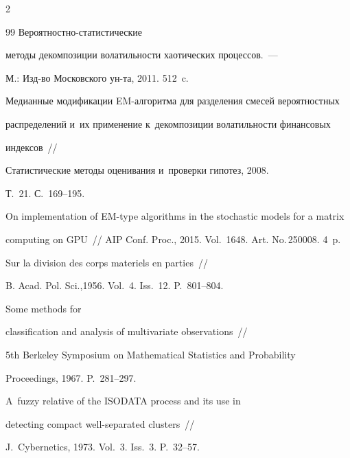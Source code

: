 \begin{multicols}{2}
{{\begin{thebibliography}{99}
 Ве\-ро\-ят\-ност\-но-ста\-ти\-сти\-че\-ские 

методы декомпозиции волатильности хаотических процессов.~--- 

М.: Изд-во Московского ун-та, 2011. 512~c.





Медианные модификации EM-алгоритма для разделения смесей вероятностных 

распределений и~их применение к~декомпозиции волатильности финансовых 

индексов~//

Статистические методы оценивания и~про\-вер\-ки гипотез, 2008. 

Т.~21. С.~169--195.





On implementation of EM-type algorithms in the stochastic models for a matrix 

computing on GPU~// AIP Conf. Proc., 2015. Vol.~1648. Art. No.\,250008. 4~p.




 Sur la division des corps materiels en parties~// 

B. Acad. Pol. Sci.,1956. Vol.~4. Iss.~12. P.~801--804.




 Some methods for 

classification and analysis of multivariate observations~// 

5th Berkeley Symposium on Mathematical Statistics and Probability

Proceedings, 1967. P.~281--297.




 A~fuzzy relative of the ISODATA process and its use in 

detecting compact well-separated clusters~// 

J.~Cybernetics, 1973. Vol.~3. Iss.~3. P.~32--57.





\end{thebibliography}}}
\end{multicols}
